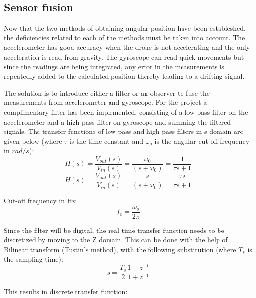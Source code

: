 \subsection{Sensor fusion}
Now that the two methods of obtaining angular position have been estableshed, the deficiencies related to each of the methods must be taken into account. The accelerometer has good accuracy when the drone is not accelerating and the only acceleration is read from gravity.
The gyroscope can read quick movements but since the readings are being integrated, any error in the measurements is repeatedly added to the calculated position thereby leading to a drifting signal.

The solution is to introduce either a filter or an observer to fuse the measurements from accelerometer and gyroscope. For the project a complimentary filter has been implemented, consisting of a low pass filter on the accelerometer and a high pass filter on gyroscope and summing the filtered signals.
\newline
The transfer functions of low pass and high pass filters in s domain are given below (where $\tau$ is the time constant and $\omega _o$ is the angular cut-off frequency in $rad/s$):\newline 
\begin{displaymath}
H(s) = \frac{V_{out}(s)}{V_{in}(s)} = \frac{\omega_0}{(s+\omega_0)}= \frac{1}{\tau s+1}
\end{displaymath}
\begin{displaymath}
H(s) = \frac{V_{out}(s)}{V_{in}(s)} = \frac{s}{(s+\omega_0)}= \frac{\tau s}{\tau s+1}
\end{displaymath}

Cut-off frequency in Hz:
\begin{displaymath}
    f_c=\frac{\omega _o}{2\pi}
\end{displaymath}
\newline

Since the filter will be digital, the real time transfer function needs to be discretized by moving to the Z domain. This can be done with the help of Bilinear transform (Tustin's method), with the following substitution (where $T_s$ is the sampling time)\cite{Digital_filters}:
\begin{displaymath}
    s=\frac{T_s}{2}\frac{1-z^{-1}}{1+z^{-1}}
\end{displaymath}


 This results in discrete transfer function: 



